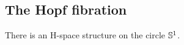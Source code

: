 \documentclass[hott-all.tex]{subfiles}
\begin{document}
\subsection{The Hopf fibration}
% 
% 
\begin{lem}
  There is an H-space structure on the circle $\mathbb{S}^1$.
\end{lem}
% 
\end{document}
